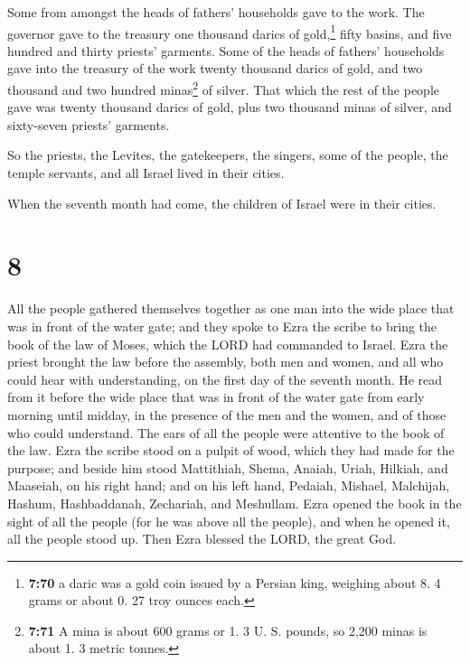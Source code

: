  Some from amongst the heads of fathers' households gave
to the work. The governor gave to the treasury one thousand darics of
gold,\footnote{\textbf{7:70} a daric was a gold coin issued by a Persian
  king, weighing about 8. 4 grams or about 0. 27 troy ounces each.}
fifty basins, and five hundred and thirty priests' garments.
 Some of the heads of fathers' households gave into the
treasury of the work twenty thousand darics of gold, and two thousand
and two hundred minas\footnote{\textbf{7:71} A mina is about 600 grams
  or 1. 3 U. S. pounds, so 2,200 minas is about 1. 3 metric tonnes.} of
silver.  That which the rest of the people gave was
twenty thousand darics of gold, plus two thousand minas of silver, and
sixty-seven priests' garments.

 So the priests, the Levites, the gatekeepers, the
singers, some of the people, the temple servants, and all Israel lived
in their cities.

When the seventh month had come, the children of Israel were in their
cities.

\hypertarget{section-7}{%
\section{8}\label{section-7}}

 All the people gathered themselves together as one man
into the wide place that was in front of the water gate; and they spoke
to Ezra the scribe to bring the book of the law of Moses, which the LORD
had commanded to Israel.  Ezra the priest brought the law
before the assembly, both men and women, and all who could hear with
understanding, on the first day of the seventh month.  He
read from it before the wide place that was in front of the water gate
from early morning until midday, in the presence of the men and the
women, and of those who could understand. The ears of all the people
were attentive to the book of the law.  Ezra the scribe
stood on a pulpit of wood, which they had made for the purpose; and
beside him stood Mattithiah, Shema, Anaiah, Uriah, Hilkiah, and
Maaseiah, on his right hand; and on his left hand, Pedaiah, Mishael,
Malchijah, Hashum, Hashbaddanah, Zechariah, and Meshullam.
 Ezra opened the book in the sight of all the people (for
he was above all the people), and when he opened it, all the people
stood up.  Then Ezra blessed the LORD, the great God.

